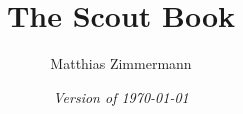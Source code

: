 
\author{Matthias Zimmermann}
\title{\Huge\bf The Scout Book}
\ifpdf
  \isodate
\fi
\date{\emph{Version of \today}}
\maketitle

